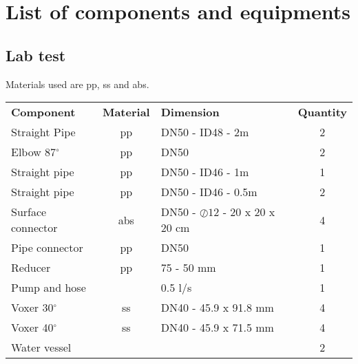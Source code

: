 \chapter{List of components and equipments}\label{appx:third}

\section{Lab test}
Materials used are \gls{pp}, \gls{ss} and \gls{abs}.
\begin{table}[h!]
\centering
\begin{tabular}{lclc}
\textbf{Component} & \textbf{Material} & \textbf{Dimension}           & \textbf{Quantity} \\
Straight Pipe     & \gls{pp}     & DN50 - ID48 - 2m             & 2        \\
Elbow 87$^{\circ}$          & pp       & DN50                         & 2        \\
Straight pipe     & \gls{pp}        & DN50 - ID46 - 1m             & 1        \\
Straight pipe     & \gls{pp}         & DN50 - ID46 - 0.5m           & 2        \\
Surface connector & \gls{abs}     & DN50 - $\oslash 12$ - 20 x 20 x 20 cm & 4        \\
Pipe connector    & \gls{pp}         & DN50                         & 1        \\
Reducer           & \gls{pp}          & 75 - 50 mm                   & 1        \\
Pump and hose     &          & 0.5 l/s                      & 1        \\
Voxer 30$^{\circ}$           &     \gls{ss}     & DN40 - 45.9 x 91.8 mm        & 4        \\
Voxer 40$^{\circ}$           &    \gls{ss}      & DN40 - 45.9 x 71.5 mm        & 4        \\
Water vessel      &          &                              & 2        
\end{tabular}
\end{table}

